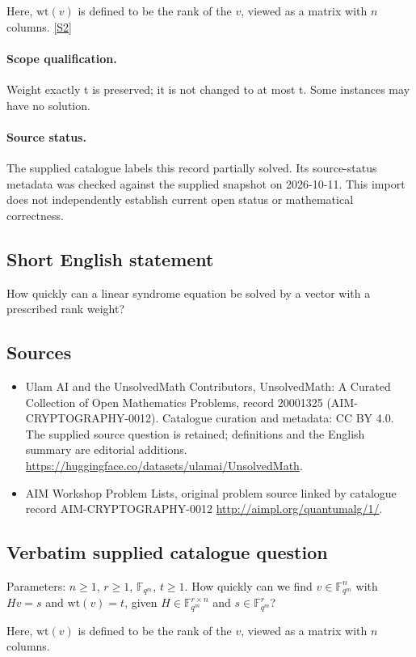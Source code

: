 \documentclass[11pt]{article}
\begin{document}
Here, $\text{wt}(v)$ is defined to be the rank of the $v$, viewed as a matrix with $n$ columns. \href{http://aimpl.org/quantumalg/1/}{[S2]}
\paragraph{Scope qualification.}
Weight exactly t is preserved; it is not changed to at most t. Some instances may have no solution.
\paragraph{Source status.}
The supplied catalogue labels this record partially solved. Its source-status metadata was checked against the supplied snapshot on 2026-10-11. This import does not independently establish current open status or mathematical correctness.
\subsection{Short English statement}
How quickly can a linear syndrome equation be solved by a vector with a prescribed rank weight?
\subsection{Sources}
\begin{itemize}
\item[S1] Ulam AI and the UnsolvedMath Contributors, UnsolvedMath: A Curated Collection of Open Mathematics Problems, record 20001325 (AIM-CRYPTOGRAPHY-0012). Catalogue curation and metadata: CC BY 4.0. The supplied source question is retained; definitions and the English summary are editorial additions.
\url{https://huggingface.co/datasets/ulamai/UnsolvedMath}.
\item[S2] AIM Workshop Problem Lists, original problem source linked by catalogue record AIM-CRYPTOGRAPHY-0012
\url{http://aimpl.org/quantumalg/1/}.
\end{itemize}
\subsection{Verbatim supplied catalogue question}
Parameters: $n \geq 1$, $r\geq 1$, $\mathbb F_{q^m}$, $t \geq 1$. How quickly can we find $v\in \mathbb F_{q^m}^n$ with $Hv = s$ and $\text{wt}(v) = t$, given $H\in \mathbb F_{q^m}^{r\times n}$ and $s\in \mathbb F_{q^m}^r$?

Here, $\text{wt}(v)$ is defined to be the rank of the $v$, viewed as a matrix with $n$ columns.
\end{document}
